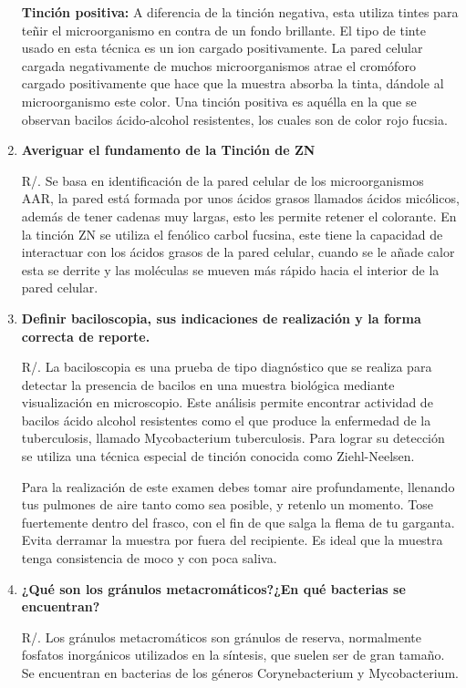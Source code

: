 \documentclass[journal,transmag]{IEEEtran}
\begin{document}
\begin{enumerate}
\textbf{Tinción positiva:} A diferencia de la tinción negativa, esta utiliza tintes para teñir el microorganismo en contra de un fondo brillante. El tipo de tinte usado en esta técnica es un ion cargado positivamente. La pared celular cargada negativamente de muchos microorganismos atrae el cromóforo cargado positivamente que hace que la muestra absorba la tinta, dándole al microorganismo este color.
Una tinción positiva es aquélla en la que se observan bacilos ácido-alcohol resistentes, los cuales son de color rojo fucsia. 

\item \textbf{Averiguar el fundamento de la Tinción de ZN }

R/. Se basa en identificación de la pared celular de los microorganismos AAR, la pared está formada por unos ácidos grasos llamados ácidos micólicos, además de tener cadenas muy largas, esto les permite retener el colorante. En la tinción ZN se utiliza el fenólico carbol fucsina, este tiene la capacidad de interactuar con los ácidos grasos de la pared celular, cuando se le añade calor esta se derrite y las moléculas se mueven más rápido hacia el interior de la pared celular.

\item \textbf{Definir baciloscopia, sus indicaciones de realización y la forma correcta de reporte. }

R/. La baciloscopia es una prueba de tipo diagnóstico que se realiza para detectar la presencia de bacilos en una muestra biológica mediante visualización en microscopio. Este análisis permite encontrar actividad de bacilos ácido alcohol resistentes como el que produce la enfermedad de la tuberculosis, llamado Mycobacterium tuberculosis. Para lograr su detección se utiliza una técnica especial de tinción conocida como Ziehl-Neelsen.

Para la realización de este examen debes tomar aire profundamente, llenando tus pulmones de aire tanto como sea posible, y retenlo un momento. Tose fuertemente dentro del frasco, con el fin de que salga la flema de tu garganta. Evita derramar la muestra por fuera del recipiente. Es ideal que la muestra tenga consistencia de moco y con poca saliva.

	\item \textbf{¿Qué son los gránulos metacromáticos?¿En qué bacterias se encuentran?}
	
	R/. Los gránulos metacromáticos son gránulos de reserva, normalmente fosfatos inorgánicos utilizados en la síntesis, que suelen ser de gran tamaño. Se encuentran en bacterias de los géneros Corynebacterium y Mycobacterium.

	\end{enumerate}
	
\end{document}
